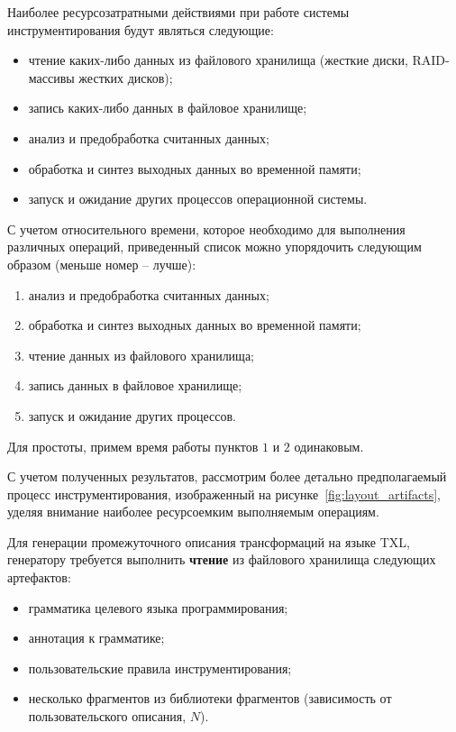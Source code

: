 Наиболее ресурсозатратными действиями при работе системы инструментирования будут являться следующие:
\begin{itemize}[noitemsep]
  \item чтение каких-либо данных из файлового хранилища (жесткие диски, RAID-массивы жестких дисков);
  \item запись каких-либо данных в файловое хранилище;
  \item анализ и предобработка считанных данных;
  \item обработка и синтез выходных данных во временной памяти;
  \item запуск и ожидание других процессов операционной системы.
\end{itemize}

С учетом относительного времени, которое необходимо для выполнения различных операций, приведенный список можно упорядочить следующим образом (меньше номер -- лучше):
\begin{enumerate}[noitemsep]
  \item анализ и предобработка считанных данных;
  \item обработка и синтез выходных данных во временной памяти;
  \item чтение данных из файлового хранилища;
  \item запись данных в файловое хранилище;
  \item запуск и ожидание других процессов.
\end{enumerate}

Для простоты, примем время работы пунктов $1$ и $2$ одинаковым.

С учетом полученных результатов, рассмотрим более детально предполагаемый процесс инструментирования, изображенный на рисунке~\ref{fig:layout_artifacts}, уделяя внимание наиболее ресурсоемким выполняемым операциям.

Для генерации промежуточного описания трансформаций на языке TXL, генератору требуется выполнить \textbf{чтение} из файлового хранилища следующих артефактов:
\begin{itemize}[noitemsep]
  \item грамматика целевого языка программирования;
  \item аннотация к грамматике;
  \item пользовательские правила инструментирования;
  \item несколько фрагментов из библиотеки фрагментов (зависимость от пользовательского описания, $N$).
\end{itemize}

